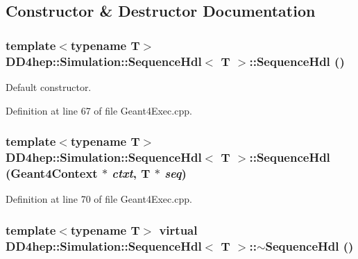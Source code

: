 \subsection{Constructor \& Destructor Documentation}
\hypertarget{class_d_d4hep_1_1_simulation_1_1_sequence_hdl_aeb88368d61e8f34a82e6acc1c8794521}{
\subsubsection[{SequenceHdl}]{\setlength{\rightskip}{0pt plus 5cm}template$<$typename T$>$ {\bf DD4hep::Simulation::SequenceHdl}$<$ {\bf T} $>$::{\bf SequenceHdl} ()}}
\label{class_d_d4hep_1_1_simulation_1_1_sequence_hdl_aeb88368d61e8f34a82e6acc1c8794521}


Default constructor. 

Definition at line 67 of file Geant4Exec.cpp.\hypertarget{class_d_d4hep_1_1_simulation_1_1_sequence_hdl_a6a75a0ed136c559a8187ebcf6713a014}{
\subsubsection[{SequenceHdl}]{\setlength{\rightskip}{0pt plus 5cm}template$<$typename T$>$ {\bf DD4hep::Simulation::SequenceHdl}$<$ {\bf T} $>$::{\bf SequenceHdl} ({\bf Geant4Context} $\ast$ {\em ctxt}, \/  {\bf T} $\ast$ {\em seq})}}
\label{class_d_d4hep_1_1_simulation_1_1_sequence_hdl_a6a75a0ed136c559a8187ebcf6713a014}


Definition at line 70 of file Geant4Exec.cpp.\hypertarget{class_d_d4hep_1_1_simulation_1_1_sequence_hdl_af01dc42f94e773bcd01406fbcc178f4d}{
\subsubsection[{$\sim$SequenceHdl}]{\setlength{\rightskip}{0pt plus 5cm}template$<$typename T$>$ virtual {\bf DD4hep::Simulation::SequenceHdl}$<$ {\bf T} $>$::$\sim${\bf SequenceHdl} ()}}
\label{class_d_d4hep_1_1_simulation_1_1_sequence_hdl_af01dc42f94e773bcd01406fbcc178f4d}


